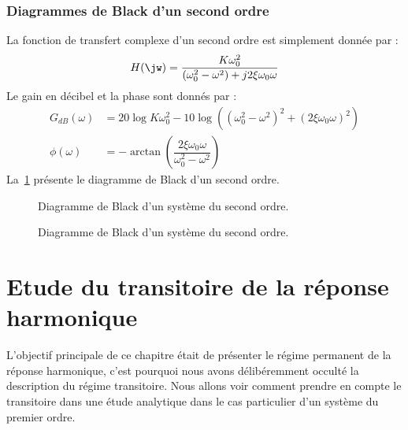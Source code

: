 \subsubsection{Diagrammes de Black d'un second ordre}
La fonction de transfert complexe d'un second ordre est simplement donnée par :
\[
    H(\jw)=\dfrac{K\omega_0^2}{(\omega_0^2-\omega^2)+j2\xi\omega_0\omega}
\]
Le gain en décibel et la phase sont donnés par :
\begin{align*}
    G_{dB}(\omega)&=20\log{K\omega_0^2}-10
                    \log{\left((\omega_0^2-\omega^2)^2+
                               (2\xi\omega_0\omega)^2\right)} \\
      \phi(\omega)&=-\arctan{\left(\dfrac{2\xi\omega_0\omega}{\omega_0^2-\omega^2}\right)}
\end{align*}
La~\cref{fig-black_4} présente le diagramme de Black d'un second ordre.
\begin{figure}[!h]
    \centering
    
    \caption{Diagramme de Black d'un système du second ordre. 
    \label{fig-black_4}}
\end{figure}
\begin{figure}[!h]
    \centering
    
    \caption{Diagramme de Black d'un système du second ordre. 
    \label{fig-black_5}}
\end{figure}
\clearpage
\restoregeometry
\captionsetup{width=0.9\linewidth}
\section{Etude du transitoire de la réponse harmonique}
L'objectif principale de ce chapitre était de présenter le régime permanent
de la réponse harmonique, c'est pourquoi nous avons délibéremment occulté 
la description du régime transitoire.
Nous allons voir comment prendre en compte le transitoire dans une étude
analytique dans le cas particulier d'un système du premier ordre.
